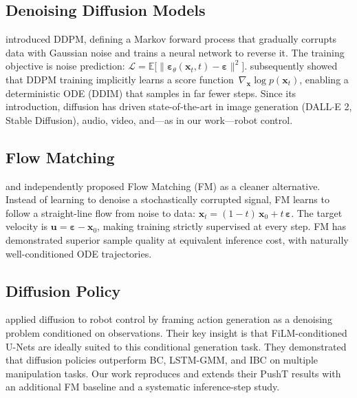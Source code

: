 \documentclass[10pt,letterpaper]{article}
\begin{document}
\subsection{Denoising Diffusion Models}

\citet{ho2020ddpm} introduced DDPM, defining a Markov forward process that
gradually corrupts data with Gaussian noise and trains a neural network to reverse
it.
The training objective is noise prediction:
$\mathcal{L} = \mathbb{E}\bigl[\|\boldsymbol{\varepsilon}_\theta(\mathbf{x}_t, t) -
\boldsymbol{\varepsilon}\|^2\bigr]$.
\citet{song2021ddim} subsequently showed that DDPM training implicitly learns a
score function~$\nabla_{\mathbf{x}} \log p(\mathbf{x}_t)$, enabling a deterministic
ODE (DDIM) that samples in far fewer steps.
Since its introduction, diffusion has driven state-of-the-art in image generation
(DALL$\cdot$E 2, Stable Diffusion), audio, video, and---as in our work---robot
control.

\subsection{Flow Matching}

\citet{lipman2023flow} and \citet{liu2023rectified} independently proposed Flow
Matching (FM) as a cleaner alternative.
Instead of learning to denoise a stochastically corrupted signal, FM learns to
follow a straight-line flow from noise to data:
$\mathbf{x}_t = (1{-}t)\,\mathbf{x}_0 + t\,\boldsymbol{\varepsilon}$.
The target velocity is $\mathbf{u} = \boldsymbol{\varepsilon} - \mathbf{x}_0$,
making training strictly supervised at every step.
FM has demonstrated superior sample quality at equivalent inference cost, with
naturally well-conditioned ODE trajectories.

\subsection{Diffusion Policy}

\citet{chi2023diffusion} applied diffusion to robot control by framing action
generation as a denoising problem conditioned on observations.
Their key insight is that FiLM-conditioned U-Nets are ideally suited to this
conditional generation task.
They demonstrated that diffusion policies outperform BC, LSTM-GMM, and IBC on
multiple manipulation tasks.
Our work reproduces and extends their PushT results with an additional FM baseline
and a systematic inference-step study.

\end{document}
